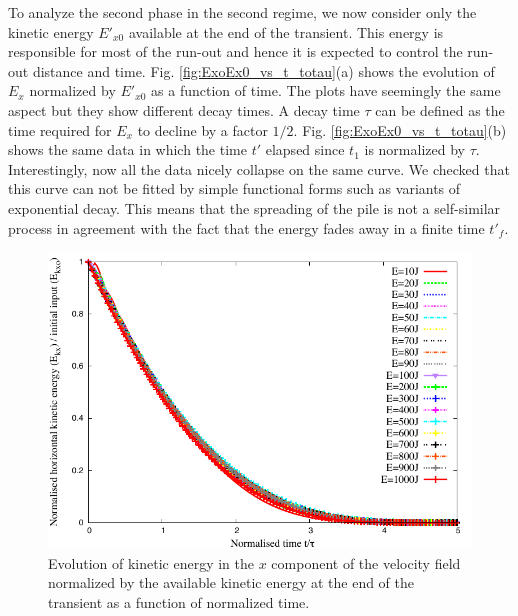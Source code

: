 To analyze the second phase in the second regime, we now consider only the 
kinetic energy $E'_{x0}$ available at the end of the transient. This energy 
is responsible for most of the run-out and hence it is expected to control the 
run-out distance and time. Fig. \ref{fig:ExoEx0_vs_t_totau}(a) shows the 
evolution of $E_x$ normalized by $E'_{x0}$ as a function of time. The plots 
have seemingly the same aspect but they show different decay times. A decay 
time $\tau$ can be defined as the time required for $E_x$ to decline by a 
factor $1/2$. Fig. \ref{fig:ExoEx0_vs_t_totau}(b) shows the same data in which 
the time $t'$ elapsed since $t_1$ is normalized by $\tau$. Interestingly, now 
all the data nicely collapse on the same curve. We checked that this curve can 
not be fitted by simple functional forms such as variants of exponential decay. 
This means that the spreading of the pile is not a self-similar process in 
agreement with the fact that the energy fades away in a finite time $t'_f$. 


\begin{figure}[tbhp]
\centering
\includegraphics[width=\textwidth]{EkxKoTTau_Slope}
\caption{Evolution of kinetic energy in the $x$ component of 
the velocity field  normalized by the available kinetic energy at the end of 
the transient as a function of normalized time.}
\label{fig:ExEx0_vs_ttau}
\end{figure}


